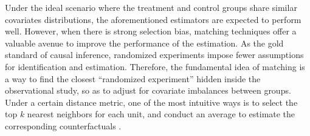 \begin{comment}
Another concern associated with the classical AIPW estimator is the potential for estimates to fall outside the admissible parameter range. For example, in MIMIC3 data where the outcome of interest is the mortality rate of patients, we may yield a completely impractical estimator where the estimated death rate exceeds $1$ or falls below $0$ if the data is substantially noisy or the model fitting process doesn't perform well. 


Targeted Maximum Likelihood Estimation \citep{gruber2010targeted, gruber2012tmle}, or TMLE,  was designed to handle this problem. Starting from an initial estimator, TMLE aims to gradually adjust it by fitting it to the data where it matters most for the target estimand. As a special kind of AIPW estimator, TMLE not only inherits the advantageous properties of double robustness and semi-parametric efficiency in large-sample performance but also demonstrates compelling finite-sample performance. TMLE typically adheres to the parameter range of the estimand, ensuring practicality in its outcomes. Additionally, it also partly improves the estimation stability against near violation of the positivity assumption.
\end{comment}
Under the ideal scenario where the treatment and control groups share similar covariates distributions, the aforementioned estimators are expected to perform well. However, when there is strong selection bias, matching techniques \citep{heckman1998matching, abadie2006large, abadie2008failure, abadie2011bias, caliendo2008some} offer a valuable avenue to improve the performance of the estimation. As the gold standard of causal inference, randomized experiments impose fewer assumptions for identification and estimation. Therefore, the fundamental idea of matching is a way to find the closest ``randomized experiment'' hidden inside the observational study, so as to adjust for covariate imbalances between groups. Under a certain distance metric, one of the most intuitive ways is to select the top $k$ nearest neighbors for each unit, and conduct an average to estimate the corresponding counterfactuals \citep{abadie2008failure}. 

